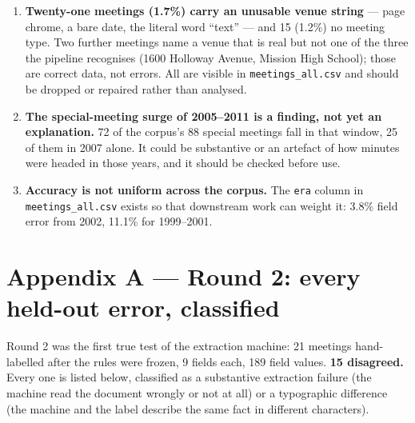 \documentclass[11pt]{article}
\begin{document}
\begin{enumerate}
\item \textbf{Twenty-one meetings (1.7\%) carry an unusable venue string} --- page chrome,
a bare date, the literal word ``text'' --- and 15 (1.2\%) no meeting type. Two further
meetings name a venue that is real but not one of the three the pipeline recognises (1600
Holloway Avenue, Mission High School); those are correct data, not errors. All are visible in
\texttt{meetings\_all.csv} and should be dropped or repaired rather than analysed.
\item \textbf{The special-meeting surge of 2005--2011 is a finding, not yet an explanation.}
72 of the corpus's 88 special meetings fall in that window, 25 of them in 2007 alone. It could be substantive or an
artefact of how minutes were headed in those years, and it should be checked before use.
\item \textbf{Accuracy is not uniform across the corpus.} The \texttt{era} column in
\texttt{meetings\_all.csv} exists so that downstream work can weight it: 3.8\% field error
from 2002, 11.1\% for 1999--2001.
\end{enumerate}

\appendix

\section{Appendix A --- Round 2: every held-out error, classified}

Round 2 was the first true test of the extraction machine: 21 meetings hand-labelled after
the rules were frozen, 9 fields each, 189 field values. \textbf{15 disagreed.} Every one is listed below, classified as a substantive extraction failure (the
machine read the document wrongly or not at all) or a typographic difference (the machine
and the label describe the same fact in different characters).
\end{document}
